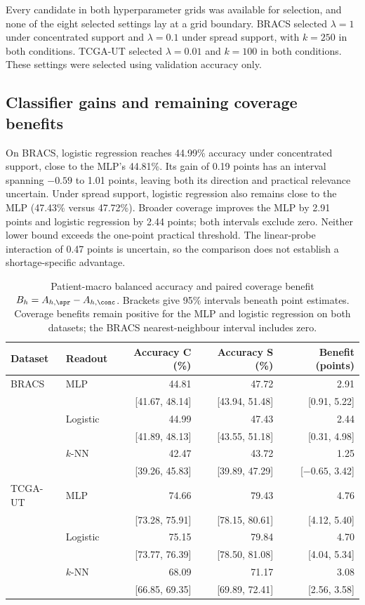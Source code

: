 \noindent Every candidate in both hyperparameter grids was available for selection, and none of the eight selected settings lay at a grid boundary. BRACS selected $\lambda=1$ under concentrated support and $\lambda=0.1$ under spread support, with $k=250$ in both conditions. TCGA-UT selected $\lambda=0.01$ and $k=100$ in both conditions. These settings were selected using validation accuracy only.

\subsection{Classifier gains and remaining coverage benefits}
On BRACS, logistic regression reaches 44.99\% accuracy under concentrated support, close to the MLP's 44.81\%. Its gain of 0.19 points has an interval spanning $-0.59$ to 1.01 points, leaving both its direction and practical relevance uncertain. Under spread support, logistic regression also remains close to the MLP (47.43\% versus 47.72\%). Broader coverage improves the MLP by 2.91 points and logistic regression by 2.44 points; both intervals exclude zero. Neither lower bound exceeds the one-point practical threshold. The linear-probe interaction of 0.47 points is uncertain, so the comparison does not establish a shortage-specific advantage.

\begin{table}[htbp]
\centering\small
\setlength{\tabcolsep}{4pt}
\begin{tabular}{@{}llrrr@{}}
\toprule
Dataset & Readout & Accuracy C (\%) & Accuracy S (\%) & Benefit (points) \\
\midrule
BRACS & MLP & 44.81 & 47.72 & 2.91 \\
 & & [41.67, 48.14] & [43.94, 51.48] & [0.91, 5.22] \\
 & Logistic & 44.99 & 47.43 & 2.44 \\
 & & [41.89, 48.13] & [43.55, 51.18] & [0.31, 4.98] \\
 & $k$-NN & 42.47 & 43.72 & 1.25 \\
 & & [39.26, 45.83] & [39.89, 47.29] & [$-0.65$, 3.42] \\
\addlinespace
TCGA-UT & MLP & 74.66 & 79.43 & 4.76 \\
 & & [73.28, 75.91] & [78.15, 80.61] & [4.12, 5.40] \\
 & Logistic & 75.15 & 79.84 & 4.70 \\
 & & [73.77, 76.39] & [78.50, 81.08] & [4.04, 5.34] \\
 & $k$-NN & 68.09 & 71.17 & 3.08 \\
 & & [66.85, 69.35] & [69.89, 72.41] & [2.56, 3.58] \\
\bottomrule
\end{tabular}
\caption{Patient-macro balanced accuracy and paired coverage benefit $B_h=A_{h,\spr}-A_{h,\conc}$. Brackets give 95\% intervals beneath point estimates. Coverage benefits remain positive for the MLP and logistic regression on both datasets; the BRACS nearest-neighbour interval includes zero.}
\label{tab:results-accuracy}
\end{table}

